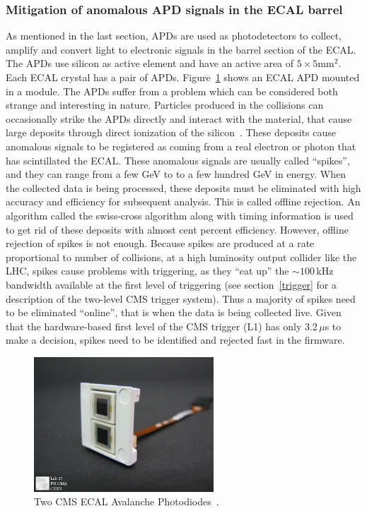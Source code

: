 \subsubsection{Mitigation of anomalous APD signals in the ECAL barrel}
As mentioned in the last section, APDs are used as photodetectors to collect, amplify and convert light to electronic signals in the barrel section of the ECAL. The APDs use silicon as active element and have an active area of $5\times5\mathrm{mm}^2$. Each ECAL crystal has a pair of APDs. Figure~\ref{fig:apd} shows an ECAL APD mounted in a module. The APDs suffer from a problem which can be considered both strange and interesting in nature. Particles produced in the collisions can occasionally strike the APDs directly and interact with the material, that cause large deposits through direct ionization of the silicon~\cite{petyt}. These deposits cause anomalous signals to be registered as coming from a real electron or photon that has scintillated the ECAL. These anomalous signals are usually called ``spikes'', and they can range from a few GeV to to a few hundred GeV in energy. When the collected data is being processed, these  deposits must be eliminated with high accuracy and efficiency for subsequent analysis. This is called offline rejection. An algorithm called the swiss-cross algorithm along with timing information is used to get rid of these deposits with almost cent percent efficiency. However, offline rejection of spikes is not enough. Because spikes are produced at a rate proportional to number of collisions, at a high luminosity output collider like the LHC, spikes cause problems with triggering, as they ``eat up'' the $\sim100\,$kHz bandwidth available at the first level of triggering (see section~\ref{trigger} for a description of the two-level CMS trigger system). Thus a majority of spikes need to be eliminated ``online'', that is when the data is being collected live. Given that the hardware-based first level of the CMS trigger (L1) has only 3.2\,$\mu$s to make a decision, spikes need to be identified and rejected fast in the firmware.     

\begin{figure}
  \begin{center}
    \captionsetup{width=.6\textwidth,justification=centering}
  \includegraphics[width=0.6\textwidth,keepaspectratio]{plots_and_figures/chapter3/apd.jpg}
\caption{Two CMS ECAL Avalanche Photodiodes~\cite{apd}.}
\label{fig:apd}
\end{center}
\end{figure}

